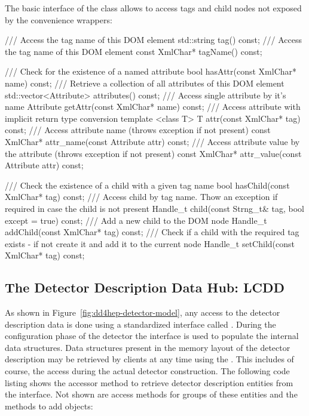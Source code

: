 \documentclass[10pt,a4paper]{article}
\begin{document}
\noindent
The basic interface of the  class allows to access tags
and child nodes not exposed by the convenience wrappers:
\begin{code}
  /// Access the tag name of this DOM element
  std::string tag() const;
  /// Access the tag name of this DOM element
  const XmlChar* tagName() const;

  /// Check for the existence of a named attribute
  bool hasAttr(const XmlChar* name) const;
  /// Retrieve a collection of all attributes of this DOM element
  std::vector<Attribute> attributes() const;
  /// Access single attribute by it's name
  Attribute getAttr(const XmlChar* name) const;
  /// Access attribute with implicit return type conversion
  template <class T> T attr(const XmlChar* tag) const;
  /// Access attribute name (throws exception if not present)
  const XmlChar* attr_name(const Attribute attr) const;
  /// Access attribute value by the attribute  (throws exception if not present)
  const XmlChar* attr_value(const Attribute attr) const;

  /// Check the existence of a child with a given tag name
  bool hasChild(const XmlChar* tag) const;
  /// Access child by tag name. Thow an exception if required in case the child is not present
  Handle_t child(const Strng_t& tag, bool except = true) const;
  /// Add a new child to the DOM node
  Handle_t addChild(const XmlChar* tag) const;
  /// Check if a child with the required tag exists - if not create it and add it to the current node
  Handle_t setChild(const XmlChar* tag) const;
\end{code}

\subsection{The Detector Description Data Hub: LCDD}
\label{sec:dd4hep-user-manual-LCDD-hub}
\noindent
As shown in Figure~\ref{fig:dd4hep-detector-model}, any access to the detector 
description data is done using a standardized interface called .
During the configuration phase of the detector the interface is used to populate
the internal data structures.
Data structures present in the memory layout of the detector description
may be retrieved by clients at any time using the 
.
This includes of course, the access during the actual detector construction.
The following code listing shows the accessor method to retrieve 
detector description entities from the interface. Not shown are access methods
for groups of these entities and the methods to add objects:
\end{document}
